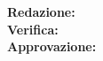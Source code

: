 \begin{titlepage}
\begin{center}
        \Huge
        \textbf{\@title}

        \Large
        \@date

        \vspace{3cm}
        
        \textbf{Redazione:} \@author\\
        \textbf{Verifica:} \@verificatore\\
        \textbf{Approvazione:} \@approvatore\\
        
        \vfill
        \makeatother
    \end{center}
\end{titlepage}
